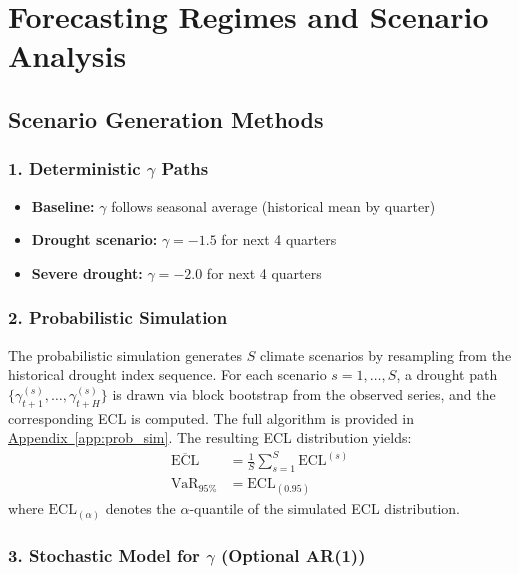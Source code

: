 \documentclass[12pt,a4paper]{article}
\begin{document}
\section{Forecasting Regimes and Scenario Analysis}

\subsection{Scenario Generation Methods}

\subsubsection*{1. Deterministic $\gamma$ Paths}
\begin{itemize}[noitemsep]
    \item \textbf{Baseline:} $\gamma$ follows seasonal average (historical mean by quarter)
    \item \textbf{Drought scenario:} $\gamma = -1.5$ for next 4 quarters
    \item \textbf{Severe drought:} $\gamma = -2.0$ for next 4 quarters
\end{itemize}

\subsubsection*{2. Probabilistic Simulation}

The probabilistic simulation generates $S$ climate scenarios by resampling from the historical drought index sequence. For each scenario $s = 1, \ldots, S$, a drought path $\{\gamma_{t+1}^{(s)}, \ldots, \gamma_{t+H}^{(s)}\}$ is drawn via block bootstrap from the observed series, and the corresponding ECL is computed. The full algorithm is provided in \hyperref[app:prob_sim]{Appendix~\ref*{app:prob_sim}}. The resulting ECL distribution yields:
\begin{align}
\overline{\text{ECL}} &= \frac{1}{S}\sum_{s=1}^{S} \text{ECL}^{(s)} \\
\text{VaR}_{95\%} &= \text{ECL}_{(0.95)}
\end{align}
where $\text{ECL}_{(\alpha)}$ denotes the $\alpha$-quantile of the simulated ECL distribution.

\subsubsection*{3. Stochastic Model for $\gamma$ (Optional AR(1))}
\end{document}
